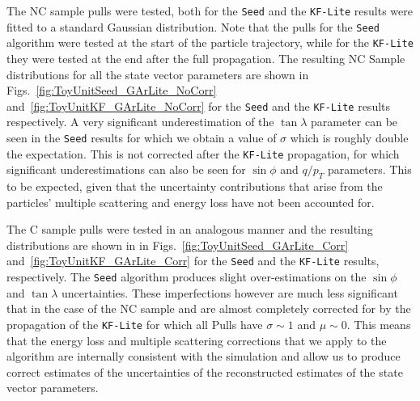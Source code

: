The NC sample pulls were tested, both for the \texttt{Seed} and the \texttt{KF-Lite} results were fitted to a standard Gaussian distribution. Note that the pulls for the \texttt{Seed} algorithm were tested at the start of the particle trajectory, while for the \texttt{KF-Lite} they were tested at the end after the full propagation. The resulting NC Sample distributions for all the state vector parameters are shown in Figs.~\ref{fig:ToyUnitSeed_GArLite_NoCorr}  and~\ref{fig:ToyUnitKF_GArLite_NoCorr} for the \texttt{Seed} and the \texttt{KF-Lite} results respectively. A very significant underestimation of the $\tan\lambda$ parameter can be seen in the \texttt{Seed}  results for which we obtain a value of $\sigma$ which is roughly double the expectation. This is not corrected after the \texttt{KF-Lite} propagation, for which significant underestimations can also be seen for $\sin\phi$ and $q/p_T$ parameters. This to be expected, given that the uncertainty contributions that arise from the particles' multiple scattering and energy loss have not been accounted for.

The C sample pulls were tested in an analogous manner and the resulting distributions are shown in in Figs.~\ref{fig:ToyUnitSeed_GArLite_Corr}  and~\ref{fig:ToyUnitKF_GArLite_Corr} for the \texttt{Seed} and the \texttt{KF-Lite} results, respectively. The \texttt{Seed} algorithm produces slight over-estimations on the $\sin\phi$ and $\tan\lambda$ uncertainties. These imperfections however are much less significant that in the case of the NC sample and are almost completely corrected for by the propagation of the \texttt{KF-Lite} for which all Pulls have $\sigma\sim 1$ and $\mu \sim 0$. This means that the energy loss and multiple scattering corrections that we apply to the algorithm are internally consistent with the simulation and allow us to produce correct estimates of the uncertainties of the reconstructed estimates of the state vector parameters.

